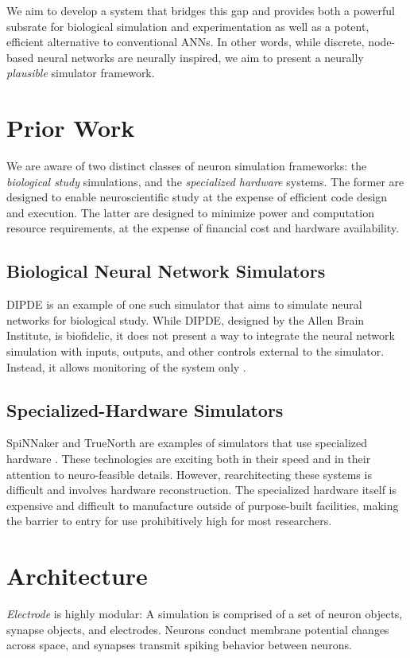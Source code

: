 \documentclass[letter, twocolumn]{article}
\begin{document}
We aim to develop a system that bridges this gap and provides both a powerful subsrate for biological simulation and experimentation as well as a potent, efficient alternative to conventional ANNs. In other words, while discrete, node-based neural networks are neurally inspired, we aim to present a neurally \textit{plausible} simulator framework.

\section{Prior Work}
We are aware of two distinct classes of neuron simulation frameworks: the \textit{biological study} simulations, and the \textit{specialized hardware} systems. The former are designed to enable neuroscientific study at the expense of efficient code design and execution. The latter are designed to minimize power and computation resource requirements, at the expense of financial cost and hardware availability.

\subsection{Biological Neural Network Simulators}
DIPDE is an example of one such simulator that aims to simulate neural networks for biological study. While DIPDE, designed by the Allen Brain Institute, is biofidelic, it does not present a way to integrate the neural network simulation with inputs, outputs, and other controls external to the simulator. Instead, it allows monitoring of the system only \cite{DIPDE}.

\subsection{Specialized-Hardware Simulators}
SpiNNaker and TrueNorth are examples of simulators that use specialized hardware \cite{SpiNNaker, truenorth}. These technologies are exciting both in their speed and in their attention to neuro-feasible details. However, rearchitecting these systems is difficult and involves hardware reconstruction. The specialized hardware itself is expensive and difficult to manufacture outside of purpose-built facilities, making the barrier to entry for use prohibitively high for most researchers.

\section{Architecture}
\textit{Electrode} is highly modular: A simulation is comprised of a set of neuron objects, synapse objects, and electrodes. Neurons conduct membrane potential changes across space, and synapses transmit spiking behavior between neurons.
\end{document}
